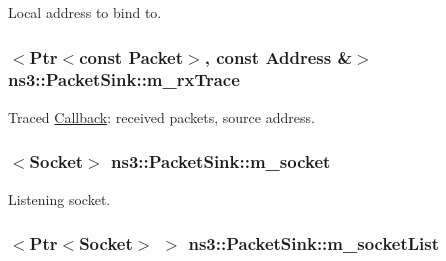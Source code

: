 Local address to bind to. 

\subsubsection[{\texorpdfstring{m\+\_\+rx\+Trace}{m_rxTrace}}]{$<${\bf Ptr}$<$const {\bf Packet}$>$, const {\bf Address} \&$>$ ns3\+::\+Packet\+Sink\+::m\+\_\+rx\+Trace\hspace{0.3cm}{\ttfamily [private]}}\hypertarget{classns3_1_1PacketSink_a8a0294426cf001db7827f4e39c46eb6e}{}\label{classns3_1_1PacketSink_a8a0294426cf001db7827f4e39c46eb6e}


Traced \hyperlink{classns3_1_1Callback}{Callback}\+: received packets, source address. 

\subsubsection[{\texorpdfstring{m\+\_\+socket}{m_socket}}]{$<${\bf Socket}$>$ ns3\+::\+Packet\+Sink\+::m\+\_\+socket\hspace{0.3cm}{\ttfamily [private]}}\hypertarget{classns3_1_1PacketSink_aeb02446587fb10cf429a39dcccb89ed0}{}\label{classns3_1_1PacketSink_aeb02446587fb10cf429a39dcccb89ed0}


Listening socket. 

\subsubsection[{\texorpdfstring{m\+\_\+socket\+List}{m_socketList}}]{$<${\bf Ptr}$<${\bf Socket}$>$ $>$ ns3\+::\+Packet\+Sink\+::m\+\_\+socket\+List\hspace{0.3cm}{\ttfamily [private]}}\hypertarget{classns3_1_1PacketSink_a510c28b6f2397952196b759a237404e9}{}\label{classns3_1_1PacketSink_a510c28b6f2397952196b759a237404e9}


